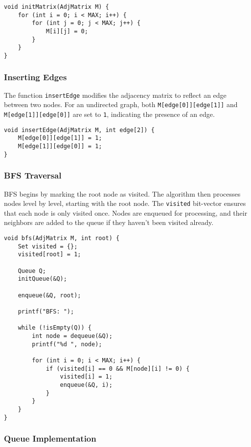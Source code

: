 \documentclass{book}
\begin{document}
\begin{verbatim}
void initMatrix(AdjMatrix M) {
    for (int i = 0; i < MAX; i++) {
        for (int j = 0; j < MAX; j++) {
            M[i][j] = 0;
        }
    }
}
\end{verbatim}

\subsubsection{Inserting Edges}

The function \texttt{insertEdge} modifies the adjacency matrix to reflect an edge between two nodes. For an undirected graph, both \texttt{M[edge[0]][edge[1]]} and \texttt{M[edge[1]][edge[0]]} are set to \texttt{1}, indicating the presence of an edge.

\begin{verbatim}
void insertEdge(AdjMatrix M, int edge[2]) {
    M[edge[0]][edge[1]] = 1;
    M[edge[1]][edge[0]] = 1;
}
\end{verbatim}

\subsubsection{BFS Traversal}

BFS begins by marking the root node as visited. The algorithm then processes nodes level by level, starting with the root node. The \texttt{visited} bit-vector ensures that each node is only visited once. Nodes are enqueued for processing, and their neighbors are added to the queue if they haven't been visited already.

\begin{verbatim}
void bfs(AdjMatrix M, int root) {
    Set visited = {};
    visited[root] = 1;
    
    Queue Q;
    initQueue(&Q);
    
    enqueue(&Q, root);
    
    printf("BFS: ");
    
    while (!isEmpty(Q)) {
        int node = dequeue(&Q);
        printf("%d ", node);
        
        for (int i = 0; i < MAX; i++) {
            if (visited[i] == 0 && M[node][i] != 0) {
                visited[i] = 1;
                enqueue(&Q, i);
            }
        }
    }
}
\end{verbatim}

\subsubsection{Queue Implementation}
\end{document}
